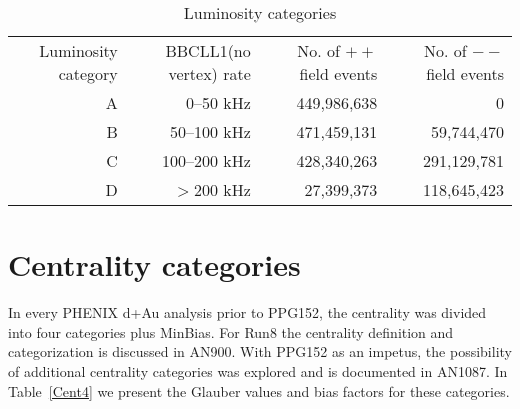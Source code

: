\documentclass[10pt]{article}
\begin{document}
\begin{table}[ht]
\caption{Luminosity categories}
\begin{tabular}{rrrr}
\hline
Luminosity category & BBCLL1(no vertex) rate & No. of $++$ field events & No. of $--$ field events  \\
A &    0--50 kHz & 449,986,638 &           0 \\
B &  50--100 kHz & 471,459,131 &  59,744,470 \\
C & 100--200 kHz & 428,340,263 & 291,129,781 \\
D &   $>$200 kHz &  27,399,373 & 118,645,423 \\
\hline
\end{tabular}
\label{lumicat}
\end{table}




\section{Centrality categories}

In every PHENIX d+Au analysis prior to PPG152, the centrality
was divided into four categories plus MinBias.
For Run8 the centrality definition and categorization
is discussed in AN900.
With PPG152 as an impetus, the possibility of additional
centrality categories was explored and is documented
in AN1087.
In Table~\ref{Cent4}
we present the Glauber values and bias factors for these categories.
\end{document}
